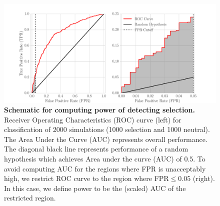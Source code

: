 \begin{figure}[H]
	\centering
	\includegraphics[trim=0.4in 0 .8in 0.02in , 
	clip,width=\textwidth]{figures/powerROC.pdf}
	\caption{{\bf Schematic for computing power of detecting
            selection.} Receiver Operating Characteristics (ROC) curve
            (left) for classification of 2000 simulations (1000 selection and
          1000 neutral). The Area Under the Curve (AUC) represents
          overall performance. The diagonal black line represents
          performance of a random hypothesis which achieves Area under
          the curve (AUC) of 0.5. To avoid computing AUC for the
          regions where FPR is unacceptably high, we restrict ROC
          curve to the region where FPR$\le 0.05$ (right). In this
          case, we define power to be the (scaled) AUC of the
          restricted region.} \label{fig:powerROC}
\end{figure}






